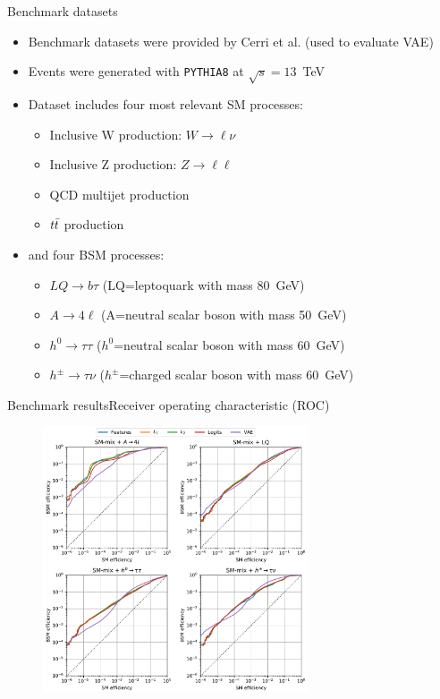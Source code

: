 \documentclass{beamer}
\begin{document}
\begin{frame}{Benchmark datasets}
  \begin{itemize}
      \item<1-> Benchmark datasets were provided by Cerri et al. (used to evaluate VAE)
      \item<2-> Events were generated with \texttt{PYTHIA8} at $\sqrt{s}=13$~TeV
      \item<3-> Dataset includes four most relevant SM processes:
        \begin{itemize}
            \item<4-> Inclusive W production: $W \rightarrow \ell\nu$
            \item<5-> Inclusive Z production: $Z \rightarrow \ell\ell$
            \item<6-> QCD multijet production
            \item<7-> $t\Bar{t}$ production
        \end{itemize}
      \item<8-> and four BSM processes:
      \begin{itemize}
    \item<9-> $LQ\rightarrow b\tau$ (LQ=leptoquark with mass 80~GeV)
    \item<10-> $A \rightarrow 4\ell$ (A=neutral scalar boson with mass 50~GeV)
    \item<11-> $h^0 \rightarrow \tau\tau$ ($h^0$=neutral scalar boson with mass 60~GeV)
    \item<12-> $h^\pm \rightarrow \tau\nu$ ($h^\pm$=charged scalar boson with mass 60~GeV)
\end{itemize}
  \end{itemize}
\end{frame}

\begin{frame}{Benchmark results}{Receiver operating characteristic (ROC)}
\begin{figure}[!htb]
\centering
\includegraphics[width=0.7\textwidth]{roc.pdf}
\end{figure}
\end{frame}
\end{document}
